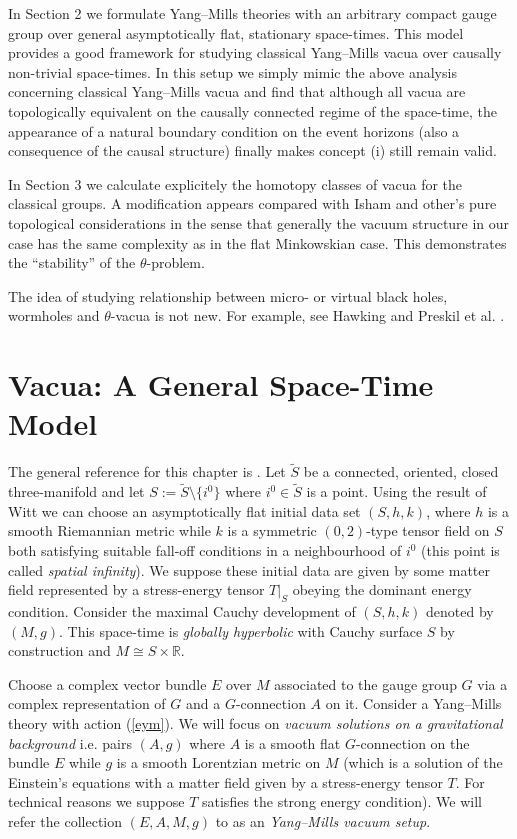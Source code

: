 \documentclass[a4paper,12pt,draft]{article}
\newcommand{\R}{{\mathbb R}}
\begin{document}
In Section 2 we formulate Yang--Mills theories with 
an arbitrary compact gauge group over general asymptotically flat,
stationary space-times. This model provides a good framework for 
studying classical Yang--Mills vacua  over causally non-trivial
space-times. In this setup we simply mimic the above analysis concerning
classical Yang--Mills vacua and find that although
all vacua are topologically equivalent on the causally connected 
regime of the space-time, the appearance of a natural boundary condition
on the event horizons (also a consequence of the causal structure) finally
makes concept (i) still remain valid. 

In Section 3 we calculate explicitely the homotopy classes of vacua for
the classical groups. A modification appears compared with Isham and
other's pure topological considerations in the sense that
generally the vacuum structure in our case has the same complexity as in
the flat Minkowskian case. This demonstrates the ``stability'' of the
$\theta$-problem.

The idea of studying relationship between micro- or virtual black
holes, wormholes and $\theta$-vacua is not new. For example, see 
Hawking \cite{haw} and Preskil et al. \cite{pres-triv}.

\section{Vacua: A General Space-Time Model}
The general reference for this chapter is \cite{wal}. Let $\widetilde{S}$ be
a connected, oriented, closed three-manifold and let
$S:=\widetilde{S}\setminus\{i^0\}$ where
$i^0\in\widetilde{S}$ is a point. Using the result of Witt \cite{wit} we
can choose an asymptotically flat initial data set
$(S, h, k)$, where $h$ is a smooth Riemannian metric while $k$ is a
symmetric $(0,2)$-type tensor field on $S$ both satisfying suitable
fall-off conditions in a neighbourhood of $i^0$ (this point is called {\it
spatial infinity}). We suppose these initial data are given by some matter
field represented by a stress-energy tensor $T\vert_S$ obeying the
dominant energy condition. Consider the maximal Cauchy development of 
$(S, h, k)$ denoted by $(M, g)$. This space-time is {\it globally
hyperbolic} with Cauchy surface $S$ by construction and $M\cong
S\times\R$. 

Choose a complex vector bundle $E$
over $M$ associated to the gauge group $G$ via a complex representation 
of $G$ and a $G$-connection $A$ on it.
Consider a Yang--Mills theory with action (\ref{eym}). We will focus on
{\it vacuum solutions on a gravitational background} i.e.
pairs $(A, g)$ where $A$ is a smooth flat $G$-connection on the bundle $E$
while $g$ is a smooth Lorentzian metric on $M$ (which is a solution of the
Einstein's equations with a matter field given by a stress-energy tensor
$T$. For technical reasons we suppose $T$ satisfies the strong
energy condition). We will refer the collection $(E, A, M, g)$ to as an
{\it Yang--Mills vacuum setup}.
\end{document}
